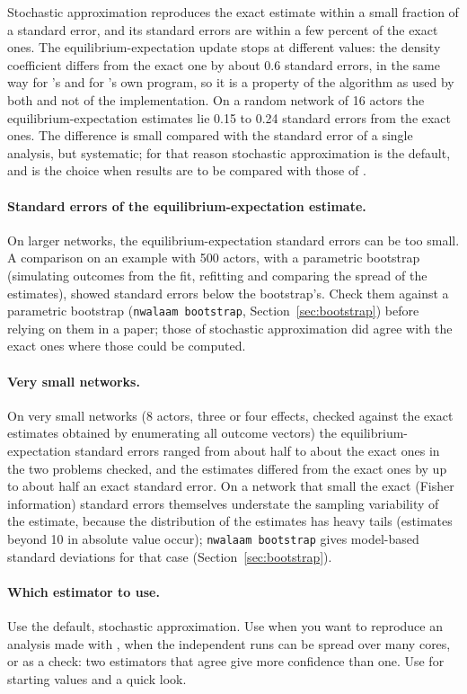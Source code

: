 Stochastic approximation reproduces the exact estimate within a small fraction of a standard error, and its standard errors are within a few percent of the exact ones. The equilibrium-expectation update stops at different values: the density coefficient differs from the exact one by about 0.6 standard errors, in the same way for \nwalaam{}'s  and for \alaamee{}'s own program, so it is a property of the algorithm as used by both and not of the implementation. On a random network of 16 actors the equilibrium-expectation estimates lie 0.15 to 0.24 standard errors from the exact ones. The difference is small compared with the standard error of a single analysis, but systematic; for that reason stochastic approximation is the default, and  is the choice when results are to be compared with those of \alaamee{}.

\paragraph{Standard errors of the equilibrium-expectation estimate.} On larger networks, the equilibrium-expectation standard errors can be too small. A comparison on an example with 500 actors, with a parametric bootstrap (simulating outcomes from the fit, refitting and comparing the spread of the estimates), showed standard errors below the bootstrap's. Check them against a parametric bootstrap (\texttt{nwalaam bootstrap}, Section~\ref{sec:bootstrap}) before relying on them in a paper; those of stochastic approximation did agree with the exact ones where those could be computed.

\paragraph{Very small networks.} On very small networks (8 actors, three or four effects, checked against the exact estimates obtained by enumerating all outcome vectors) the equilibrium-expectation standard errors ranged from about half to about the exact ones in the two problems checked, and the estimates differed from the exact ones by up to about half an exact standard error. On a network that small the exact (Fisher information) standard errors themselves understate the sampling variability of the estimate, because the distribution of the estimates has heavy tails (estimates beyond 10 in absolute value occur); \texttt{nwalaam bootstrap} gives model-based standard deviations for that case (Section~\ref{sec:bootstrap}).

\paragraph{Which estimator to use.} Use the default, stochastic approximation. Use  when you want to reproduce an analysis made with \alaamee{}, when the independent runs can be spread over many cores, or as a check: two estimators that agree give more confidence than one. Use  for starting values and a quick look.
